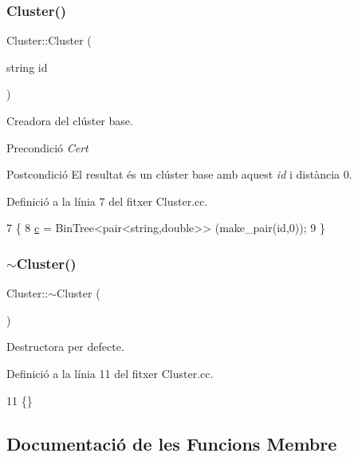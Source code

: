 \subsubsection{\texorpdfstring{Cluster()}{Cluster()}\hspace{0.1cm}{\footnotesize\ttfamily [2/2]}}
{\footnotesize\ttfamily Cluster\+::\+Cluster (\begin{DoxyParamCaption}\item[{string}]{id }\end{DoxyParamCaption})}



Creadora del clúster base. 

\begin{DoxyPrecond}{Precondició}
{\itshape Cert} 
\end{DoxyPrecond}
\begin{DoxyPostcond}{Postcondició}
El resultat és un clúster base amb aquest {\itshape id} i distància 0. 
\end{DoxyPostcond}


Definició a la línia 7 del fitxer Cluster.\+cc.


\begin{DoxyCode}
7                           \{
8     \hyperlink{class_cluster_a1a623435b5ec16328059c9300fa0dfaa}{c} = BinTree<pair<string,double>> (make\_pair(\textcolor{keywordtype}{id},0));
9 \}
\end{DoxyCode}
\mbox{\label{class_cluster_a4bddfc88ac859610acab15dd12851b58}} 
\subsubsection{\texorpdfstring{$\sim$\+Cluster()}{~Cluster()}}
{\footnotesize\ttfamily Cluster\+::$\sim$\+Cluster (\begin{DoxyParamCaption}{ }\end{DoxyParamCaption})}



Destructora per defecte. 



Definició a la línia 11 del fitxer Cluster.\+cc.


\begin{DoxyCode}
11 \{\}
\end{DoxyCode}


\subsection{Documentació de les Funcions Membre}
\mbox{\label{class_cluster_ac42a9b07faa929e29d7cfa1c334544fc}} 
